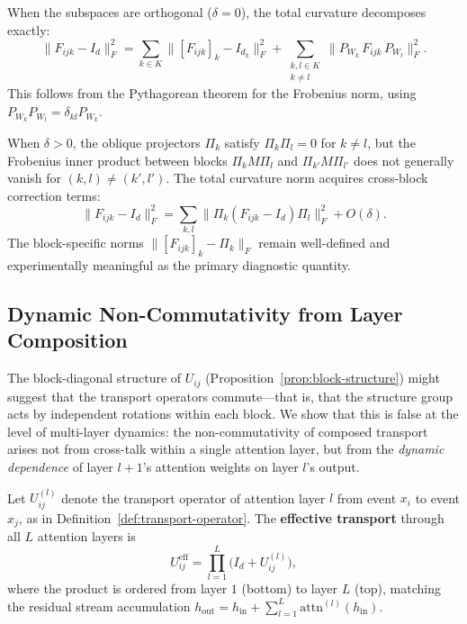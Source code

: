 \begin{remark}
\label{rem:block-decomposition}
When the subspaces are orthogonal ($\delta = 0$), the total curvature decomposes exactly:
\[
    \|F_{ijk} - I_d\|_F^2 = \sum_{k \in K} \big\|[F_{ijk}]_k - I_{d_k}\big\|_F^2
    + \sum_{\substack{k,l \in K \\ k \neq l}} \big\|P_{W_k}\, F_{ijk}\, P_{W_l}\big\|_F^2.
\]
This follows from the Pythagorean theorem for the Frobenius norm, using $P_{W_k} P_{W_l}
= \delta_{kl} P_{W_k}$.

When $\delta > 0$, the oblique projectors $\Pi_k$ satisfy $\Pi_k \Pi_l = 0$ for $k \neq
l$, but the Frobenius inner product between blocks $\Pi_k M \Pi_l$ and $\Pi_{k'} M
\Pi_{l'}$ does not generally vanish for $(k,l) \neq (k',l')$. The total curvature norm
acquires cross-block correction terms:
\[
    \|F_{ijk} - I_d\|_F^2 = \sum_{k,l} \|\Pi_k(F_{ijk} - I_d)\Pi_l\|_F^2
    + O(\delta).
\]
The block-specific norms $\|[F_{ijk}]_k - \Pi_k\|_F$ remain well-defined and
experimentally meaningful as the primary diagnostic quantity.
\end{remark}

\subsection{Dynamic Non-Commutativity from Layer Composition}
\label{sec:non-abelian}

The block-diagonal structure of $U_{ij}$ (Proposition~\ref{prop:block-structure}) might
suggest that the transport operators commute---that is, that the structure group acts by
independent rotations within each block. We show that this is false at the level of
multi-layer dynamics: the non-commutativity of composed transport arises not from
cross-talk within a single attention layer, but from the \emph{dynamic dependence} of
layer $l+1$'s attention weights on layer $l$'s output.

\begin{definition}
\label{def:effective-transport}
Let $U_{ij}^{(l)}$ denote the transport operator of attention layer $l$ from event $x_i$
to event $x_j$, as in Definition~\ref{def:transport-operator}. The \textbf{effective
transport} through all $L$ attention layers is
\[
    U_{ij}^{\mathrm{eff}} = \prod_{l=1}^{L} \big(I_d + U_{ij}^{(l)}\big),
\]
where the product is ordered from layer $1$ (bottom) to layer $L$ (top), matching the
residual stream accumulation $h_{\mathrm{out}} = h_{\mathrm{in}} + \sum_{l=1}^{L}
\mathrm{attn}^{(l)}(h_{\mathrm{in}})$.
\end{definition}

